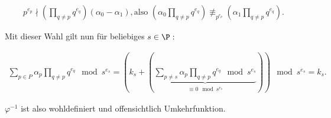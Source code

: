 \begin{solution}
\begin{align*}
    p^{e_{p}} \nmid \left(\prod_{q \neq p} q^{e_q}\right) (\alpha_0 - \alpha_1), \text{also~}
    \left(\alpha_0 \prod_{q \neq p} q^{e_q}\right) \not\equiv_{p^{e_p}}
    \left(\alpha_1 \prod_{q \neq p} q^{e_q}\right).
\end{align*}

Mit dieser Wahl gilt nun für beliebiges $s \in \P:$

\begin{align*}
\sum_{p \in P} \alpha_p \prod_{q \neq p} q^{e_q} \mod s^{e_s} =
\left(k_s + \left(\underbrace{\sum_{p \neq s} \alpha_p \prod_{q \neq p} q^{e_q}
\mod s^{e_s}}_{\substack{\equiv 0 \mod s^{e_s}}}\right)\right) \mod s^{e_s} = k_s.
\end{align*}

$\varphi^{-1}$ ist also wohldefiniert und offensichtlich Umkehrfunktion.
\end{solution}
